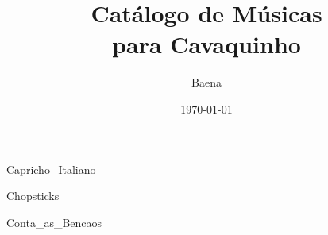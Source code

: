 \documentclass{article}
\begin{document}
\title{\textbf{\Huge Catálogo de Músicas\\ para Cavaquinho}}
\author{Baena}
\date{\today}
\maketitle
\thispagestyle{empty}
\newpage


\begin{multicols}{2}
\tableofcontents
\end{multicols}

\cleardoublepage
{}














{Capricho_Italiano}


{Chopsticks}


{Conta_as_Bencaos}
\end{document}
